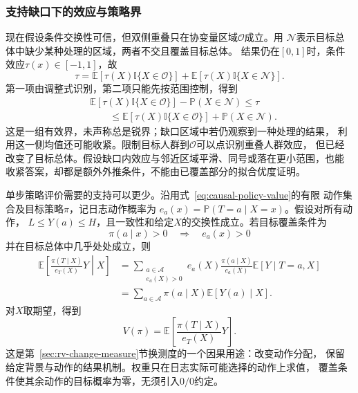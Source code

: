 \subsubsection{支持缺口下的效应与策略界}
\label{sec:causal-support-policy-bounds}

现在假设条件交换性可信，但双侧重叠只在协变量区域\(\mathcal O\)成立。用
\(\mathcal N\)表示目标总体中缺少某种处理的区域，两者不交且覆盖目标总体。
结果仍在\([0,1]\)时，条件效应\(\tau(x)\in[-1,1]\)，故
\[
  \tau=
  \mathbb E[\tau(X)\mathbb I\{X\in\mathcal O\}]
  +\mathbb E[\tau(X)\mathbb I\{X\in\mathcal N\}].
\]
第一项由调整式识别，第二项只能先按范围控制，得到
\begin{equation}
  \begin{aligned}
    &\mathbb E[\tau(X)\mathbb I\{X\in\mathcal O\}]
      -\mathbb P(X\in\mathcal N)\leq\tau\\
    &\qquad\leq
      \mathbb E[\tau(X)\mathbb I\{X\in\mathcal O\}]
      +\mathbb P(X\in\mathcal N).
  \end{aligned}
  \label{eq:causal-overlap-gap-bounds}
\end{equation}
这是一组有效界，未声称总是锐界；缺口区域中若仍观察到一种处理的结果，
利用这一侧均值还可能收紧。限制目标人群到\(\mathcal O\)可以点识别重叠人群效应，
但已经改变了目标总体。假设缺口内效应与邻近区域平滑、同号或落在更小范围，也能
收紧答案，却都是额外外推条件，不能由已覆盖部分的拟合优度证明。

单步策略评价需要的支持可以更少。沿用式~\eqref{eq:causal-policy-value}的有限
动作集合及目标策略\(\pi\)，记日志动作概率为
\(e_a(x)=\mathbb P(T=a\mid X=x)\)。假设对所有动作，
\(L\leq Y(a)\leq H\)，且一致性和给定\(X\)的交换性成立。若目标覆盖条件为
\[
  \pi(a\mid x)>0\quad\Longrightarrow\quad e_a(x)>0
\]
并在目标总体中几乎处处成立，则
\[
  \begin{aligned}
    \mathbb E\left[\frac{\pi(T\mid X)}{e_T(X)}Y\middle|X\right]
    &=
    \sum_{\substack{a\in\mathcal A\\e_a(X)>0}}
      e_a(X)\frac{\pi(a\mid X)}{e_a(X)}
      \mathbb E[Y\mid T=a,X]\\
    &=
    \sum_{a\in\mathcal A}\pi(a\mid X)\mathbb E[Y(a)\mid X].
  \end{aligned}
\]
对\(X\)取期望，得到
\begin{equation}
  V(\pi)=\mathbb E\left[\frac{\pi(T\mid X)}{e_T(X)}Y\right].
  \label{eq:causal-policy-value-weighting}
\end{equation}
这是第~\ref{sec:rv-change-measure}节换测度的一个因果用途：改变动作分配，
保留给定背景与动作的结果机制。权重只在日志实际可能选择的动作上求值，
覆盖条件使其余动作的目标概率为零，无须引入\(0/0\)约定。

